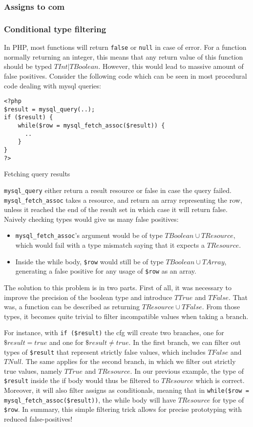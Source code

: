 \documentclass[a4paper]{article}
\begin{document}
\subsubsection{Assigns to com}

\subsubsection{Conditional type filtering}
In PHP, most functions will return \verb/false/  or \verb/null/ in case of error.
For a function normally returning an integer, this means that any return value of this
function should be typed $TInt|TBoolean$. However, this would lead to massive amount of
false positives. Consider the following code which can be seen in most procedural code
dealing with mysql queries:

\begin{listing}
  \begin{verbatim}
<?php
$result = mysql_query(..);
if ($result) {
    while($row = mysql_fetch_assoc($result)) {
      ..
    }
}
?>
  \end{verbatim}
  \caption{Fetching query results}
\end{listing}

\verb/mysql_query/ either return a result resource or false in case the query
failed. \verb/mysql_fetch_assoc/ takes a resource, and return an array
representing the row, unless it reached the end of the result set in which case
it will return false. Naively checking types would give us many false positives:
\begin{itemize}
  \item \verb/mysql_fetch_assoc/'s argument would be of type
    $TBoolean \cup TResource$, which would fail with a type mismatch saying that it
    expects a $TResource$.
  \item Inside the while body, \verb/$row/ would still be of type
    $TBoolean \cup TArray$, generating a false positive for any usage of \verb/$row/
    as an array.
\end{itemize}

The solution to this problem is in two parts. First of all, it was necessary to
improve the precision of the boolean type and introduce $TTrue$ and $TFalse$. That
was, a function can be described as returning $TResource \cup TFalse$. From those
types, it becomes quite trivial to filter incompatible values when taking a branch.

For instance, with \verb/if ($result)/ the cfg will create two branches, one
for $\$result = true$ and one for $\$result \neq true$. In the first branch, we
can filter out types of \verb/$result/ that represent strictly false values,
which includes $TFalse$ and $TNull$. The same applies for the second branch,
in which we filter out strictly true values, namely $TTrue$ and $TResource$. In
our previous example, the type of \verb/$result/ inside the if body would thus
be filtered to $TResource$ which is correct. Moreover, it will also filter
assigns as conditionals, meaning that in 
\verb/while($row = mysql_fetch_assoc($result))/, the while body will have
$TResource$ for type of \verb/$row/. In summary, this simple filtering trick allows
for precise prototyping with reduced false-positives!
\end{document}

